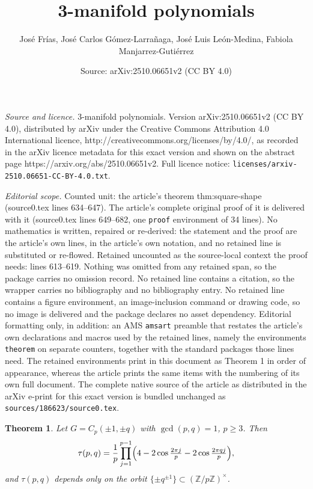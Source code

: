 \documentclass[10pt,a4paper]{amsart}
\title{3-manifold polynomials}
\author{Jos\'e Fr\'ias, Jos\'e Carlos G\'omez-Larra\~naga, Jos\'e Luis Le\'on-Medina, Fabiola Manjarrez-Guti\'errez}
\date{Source: arXiv:2510.06651v2 (CC BY 4.0)}
\newtheorem{theorem}{Theorem}
\begin{document}
\maketitle

\noindent\emph{Source and licence.} 3-manifold polynomials. Version arXiv:2510.06651v2 (CC BY 4.0), distributed by arXiv under the Creative Commons Attribution 4.0 International licence, http://creativecommons.org/licenses/by/4.0/, as recorded in the arXiv licence metadata for this exact version and shown on the abstract page https://arxiv.org/abs/2510.06651v2. Full licence notice: \texttt{licenses/arxiv-2510.06651-CC-BY-4.0.txt}.\par\smallskip

\noindent\textit{Editorial scope.} Counted unit: the article's theorem thm:square-shape (source0.tex lines 634--647). The article's complete original proof of it is delivered with it (source0.tex lines 649--682, one \texttt{proof} environment of 34 lines). No mathematics is written, repaired or re-derived: the statement and the proof are the article's own lines, in the article's own notation, and no retained line is substituted or re-flowed.  Retained uncounted as the source-local context the proof needs: lines 613--619.  Nothing was omitted from any retained span, so the package carries no omission record.  No retained line contains a citation, so the wrapper carries no bibliography and no bibliography entry.  No retained line contains a figure environment, an image-inclusion command or drawing code, so no image is delivered and the package declares no asset dependency.  Editorial formatting only, in addition: an AMS \texttt{amsart} preamble that restates the article's own declarations and macros used by the retained lines, namely the environments \texttt{theorem} on separate counters, together with the standard packages those lines need.  The retained environments print in this document as Theorem 1 in order of appearance, whereas the article prints the same items with the numbering of its own full document.  The complete native source of the article as distributed in the arXiv e-print for this exact version is bundled unchanged as \texttt{sources/186623/source0.tex}.
\begin{theorem}\label{thm:product-and-parity}
Let $G=C_p(\pm 1,\pm q)$ with $\gcd(p,q)=1$, $p\ge3$. Then
\[
\tau(p,q)=\frac{1}{p}\prod_{j=1}^{p-1}\Bigl(4-2\cos\tfrac{2\pi j}{p}-2\cos\tfrac{2\pi q j}{p}\Bigr),
\]
and $\tau(p,q)$ depends only on the orbit $\{\pm q^{\pm1}\}\subset(\mathbb{Z}/p\mathbb{Z})^\times$.
\end{theorem}
\end{document}

